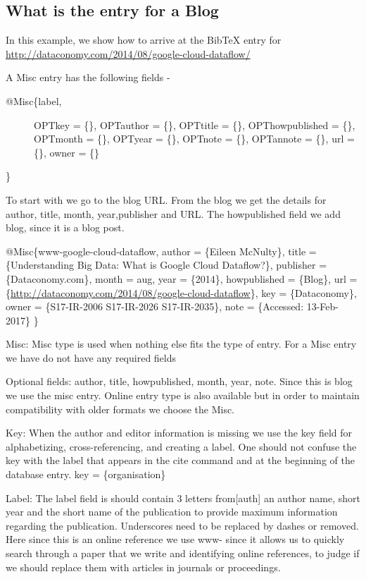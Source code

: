 \subsection{What is the entry for a Blog}
\label{\detokenize{lesson/doc/bibtex-1::doc}}\label{\detokenize{lesson/doc/bibtex-1:what-is-the-entry-for-a-blog}}
In this example, we show how to arrive at the BibTeX entry for
\url{http://dataconomy.com/2014/08/google-cloud-dataflow/}

A Misc entry has the following fields -
\begin{description}
\item[{@Misc\{label,}] \leavevmode
OPTkey =            \{\},
OPTauthor =     \{\},
OPTtitle =           \{\},
OPThowpublished = \{\},
OPTmonth =     \{\},
OPTyear =          \{\},
OPTnote =          \{\},
OPTannote =     \{\},
url = \{\},
owner = \{\}

\end{description}

\}

To start with we go to the blog URL. From the blog we get the details
for author, title, month, year,publisher and URL. The howpublished
field we add blog, since it is a blog post.

@Misc\{www-google-cloud-dataflow,
author = \{Eileen McNulty\},
title = \{Understanding Big Data: What is Google Cloud Dataflow?\},
publisher = \{Dataconomy.com\},
month = aug,
year = \{2014\},
howpublished = \{Blog\},
url = \{\url{http://dataconomy.com/2014/08/google-cloud-dataflow}\},
key = \{Dataconomy\},
owner = \{S17-IR-2006 S17-IR-2026 S17-IR-2035\},
note = \{Accessed: 13-Feb-2017\}
\}

Misc: Misc type is used when nothing else fits the type of entry. For
a Misc entry we have do not have any required fields

Optional fields:
author, title, howpublished, month, year, note.  Since this is blog we
use the misc entry. Online entry type is also available but in order
to maintain compatibility with older formats we choose the Misc.

Key:
When the author and editor information is missing we use the key field
for alphabetizing, cross-referencing, and creating a label. One should
not confuse the key with the label that appears in the cite command
and at the beginning of the database entry.  key = \{organisation\}

Label:
The label field is should contain 3 letters from{[}auth{]} an author name,
short year and the short name of the publication to provide maximum
information regarding the publication. Underscores need to be replaced
by dashes or removed. Here since this is an online reference we use
www- since it allows us to quickly search through a paper that we
write and identifying online references, to judge if we should replace
them with articles in journals or proceedings.


